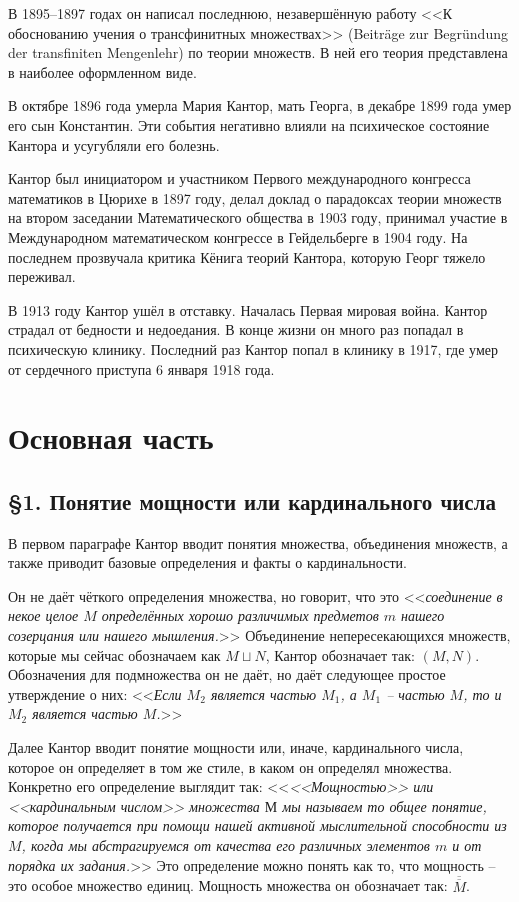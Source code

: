 \documentclass[a4paper,12pt]{extarticle}
\theoremstyle{definition}
\newcommand{\cit}[1]{<<\textit{#1}>>}
\newcommand{\car}[1]{\overline{\overline{#1}}}
\begin{document}
В 1895–1897 годах он написал последнюю, незавершённую работу <<К обоснованию учения о трансфинитных множествах>> (Beiträge zur Begründung der transfiniten Mengenlehr) по теории множеств.
В ней его теория представлена в наиболее оформленном виде. 

В октябре 1896 года умерла Мария Кантор, мать Георга, в декабре 1899 года умер его сын Константин.
Эти события негативно влияли на психическое состояние Кантора и усугубляли его болезнь.

Кантор был инициатором и участником Первого международного конгресса математиков в Цюрихе в 1897 году, делал доклад о парадоксах теории множеств на втором заседании Математического общества в 1903 году,
принимал участие в Международном математическом конгрессе в Гейдельберге в 1904 году.
На последнем прозвучала критика Кёнига теорий Кантора, которую Георг тяжело переживал.

В 1913 году Кантор ушёл в отставку. Началась Первая мировая война. Кантор страдал от бедности и недоедания.
В конце жизни он много раз попадал в психическую клинику.
Последний раз Кантор попал в клинику в 1917, где умер от сердечного приступа 6 января 1918 года.

\section{Основная часть}
\subsection{\S 1. Понятие мощности или кардинального числа}
В первом параграфе Кантор вводит понятия множества, объединения множеств, а также приводит базовые определения и факты о кардинальности.

Он не даёт чёткого определения множества, но говорит, что это \cit{соединение в некое целое $M$ определённых хорошо различимых предметов $m$ нашего созерцания или нашего мышления.}
Объединение непересекающихся множеств, которые мы сейчас обозначаем как $M \sqcup N$, Кантор обозначает так: $(M, N)$.
Обозначения для подмножества он не даёт, но даёт следующее простое утверждение о них:
\cit{Если $M_2$ является частью $M_1$, а $M_1$ -- частью $M$, то и $M_2$ является частью $M$.}

Далее Кантор вводит понятие мощности или, иначе, кардинального числа, которое он определяет в том же стиле, в каком он определял множества.
Конкретно его определение выглядит так:
\cit{<<Мощностью>> или <<кардинальным числом>> множества $М$ мы называем то общее понятие,
которое получается при помощи нашей активной мыслительной способности из $M$,
когда мы абстрагируемся от качества его различных элементов $m$ и от порядка их задания.}
Это определение можно понять как то, что мощность -- это особое множество единиц.
Мощность множества он обозначает так: $\car{M}$.
\end{document}
